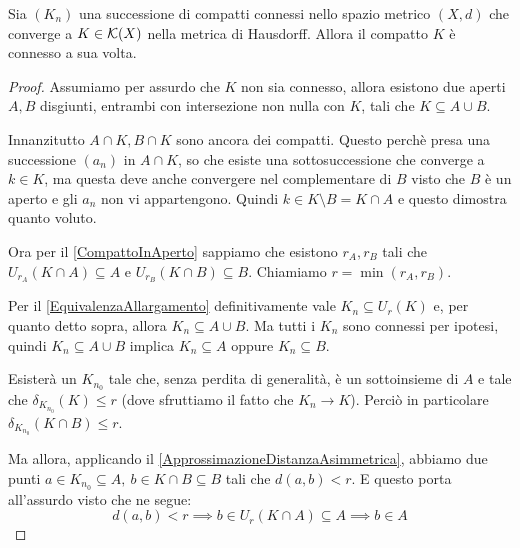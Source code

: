 \begin{theorem}
	Sia $(K_n)$ una successione di compatti connessi nello spazio metrico $(X,d)$ che converge a $K\in\mathcal{K}(X)$ nella metrica di Hausdorff. Allora il compatto $K$ è connesso a sua volta.
\end{theorem}
\begin{proof}
	Assumiamo per assurdo che $K$ non sia connesso, allora esistono due aperti $A,B$ disgiunti, entrambi con intersezione non nulla con $K$, tali che $K\subseteq A\cup B$.
	
	Innanzitutto $A\cap K, B\cap K$ sono ancora dei compatti. Questo perchè presa una successione $(a_n)$ in $A\cap K$, so che esiste una sottosuccessione che converge a $k\in K$, ma questa deve anche convergere nel complementare di $B$ visto che $B$ è un aperto e gli $a_n$ non vi appartengono. Quindi $k\in K\setminus B = K\cap A$ e questo dimostra quanto voluto.
	
	Ora per il \cref{CompattoInAperto} sappiamo che esistono $r_A,r_B$ tali che $U_{r_A}(K\cap A)\subseteq A$ e $U_{r_B}(K\cap B)\subseteq B$. Chiamiamo $r=\min(r_A,r_B)$.

	Per il \cref{EquivalenzaAllargamento} definitivamente vale $K_n\subseteq U_r(K)$ e, per quanto detto sopra, allora $K_n\subseteq A\cup B$. 
	Ma tutti i $K_n$ sono connessi per ipotesi, quindi $K_n\subseteq A\cup B$ implica $K_n\subseteq A$ oppure $K_n\subseteq B$.

	Esisterà un $K_{n_0}$ tale che, senza perdita di generalità, è un sottoinsieme di $A$ e tale che $\delta_{K_{n_0}}(K)\le r$ (dove sfruttiamo il fatto che $K_n\to K$). Perciò in particolare $\delta_{K_{n_0}}(K\cap B)\le r$.

	Ma allora, applicando il \cref{ApprossimazioneDistanzaAsimmetrica}, abbiamo due punti $a\in K_{n_0}\subseteq A,\ b\in K\cap B\subseteq B$ tali che $d(a,b)<r$. E questo porta all'assurdo visto che ne segue:
	\begin{equation*}
		d(a,b)<r\implies b\in U_r(K\cap A) \subseteq A \implies b\in A
	\end{equation*}
	

	
\end{proof}



